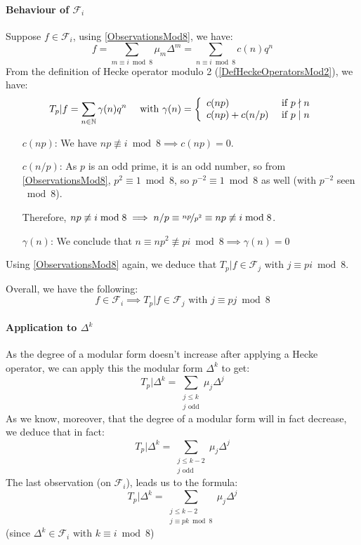 \paragraph{Behaviour of $\mathcal{F}_i$}
Suppose $f \in \mathcal{F}_i$, using \ref{ObservationsMod8}, we have:
$$
f
= \sum_{m \equiv i \bmod 8} \mu_m\Delta^m 
= \sum_{n \equiv i \bmod 8} c(n)q^n
$$
From the definition of Hecke operator modulo 2 (\ref{DefHeckeOperatorsMod2}), we have:
$$
T_p|f
= \sum_{n \in \mathbb{N}} \gamma(n)q^n
\quad \text{ with }
\gamma(n) = 
\left\lbrace 
\begin{array}{l l}
c(np)        & \text{ if } p \nmid n \\
c(np)+c(n/p) & \text{ if } p \mid  n
\end{array}
\right.
$$
\begin{enumerate}
	\item [$c(np)$:] We have $np \not \equiv i \bmod 8 \implies c(np) = 0$.
	\item [$c(n/p)$:] As $p$ is an odd prime, it is an odd number, so from \ref{ObservationsMod8}, $p^2 \equiv 1 \bmod 8$, so $p^{-2} \equiv 1 \bmod 8$ as well (with $p^{-2}$ seen $\bmod 8$).
	
	Therefore, $np \not\equiv i \bmod 8 \implies  n/p \equiv \nicefrac{np}{p^2} \equiv np \not\equiv i \bmod 8 $.
	
	\item [$\gamma(n)$:] We conclude that $n \equiv np^2 \not\equiv pi \bmod 8 \implies \gamma(n) = 0$
\end{enumerate}
Using \ref{ObservationsMod8} again, we deduce that $T_p|f \in \mathcal{F}_j$ with $j \equiv pi \bmod 8$.

Overall, we have the following:
$$
f \in \mathcal{F}_i \implies T_p|f \in \mathcal{F}_j
\text{ with } j \equiv pj \bmod 8
$$

\paragraph{Application to $\Delta^k$}
As the degree of a modular form doesn't increase after applying a Hecke operator, we can apply this the modular form $\Delta^k$ to get:
$$
T_p|\Delta^k = \sum_{\substack{j \leq k \\ j \text{ odd}}} \mu_j\Delta^j
$$
As we know, moreover, that the degree of a modular form will in fact decrease, we deduce that in fact:
\[
T_p|\Delta^k = \sum_{\substack{j \leq k-2\\ j \text{ odd}}} \mu_j\Delta^j
\label{eq:TpDelta^k} \tag{*}
\]
The last observation (on $\mathcal{F}_i$), leads us to the formula:
\[
T_p|\Delta^k = \sum_{\substack{j \leq k-2\\ j \equiv pk \bmod 8}} \mu_j\Delta^j
\label{eq:TpDelta^k_bis} \tag{**}
\]
(since $\Delta^k \in \mathcal{F}_i \text{ with } k \equiv i \bmod 8$)

